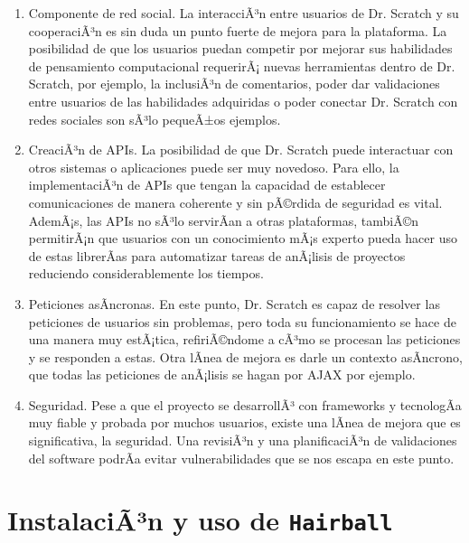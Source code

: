 \documentclass[a4paper, 12pt]{book}
\begin{document}
\begin{enumerate}
  \item Componente de red social. La interacciÃ³n entre usuarios de Dr. Scratch y su
	cooperaciÃ³n es sin duda un punto fuerte de mejora para la plataforma. La posibilidad
	de que los usuarios puedan competir por mejorar sus habilidades de pensamiento
	computacional requerirÃ¡ nuevas herramientas dentro de Dr. Scratch, por ejemplo, la
	inclusiÃ³n de comentarios, poder dar validaciones entre usuarios de las habilidades
	adquiridas o poder conectar Dr. Scratch con redes sociales son sÃ³lo pequeÃ±os ejemplos.
  \item CreaciÃ³n de APIs. La posibilidad de que Dr. Scratch puede interactuar con
	otros sistemas o aplicaciones puede ser muy novedoso. Para ello, la implementaciÃ³n
	de APIs que tengan la capacidad de establecer comunicaciones de manera coherente y
	sin pÃ©rdida de seguridad es vital. AdemÃ¡s, las APIs no sÃ³lo servirÃ­an a otras
	plataformas, tambiÃ©n permitirÃ¡n que usuarios con un conocimiento mÃ¡s experto pueda
	hacer uso de estas librerÃ­as para automatizar tareas de anÃ¡lisis de proyectos 
	reduciendo considerablemente los tiempos.
	\item Peticiones asÃ­ncronas. En este punto, Dr. Scratch es capaz de resolver las
	peticiones de usuarios sin problemas, pero toda su funcionamiento se hace de una
	manera muy estÃ¡tica, refiriÃ©ndome a cÃ³mo se procesan las peticiones y se responden
	a estas. Otra lÃ­nea de mejora es darle un contexto asÃ­ncrono, que todas las 
	peticiones de anÃ¡lisis se hagan por AJAX por ejemplo.
	\item Seguridad. Pese a que el proyecto se desarrollÃ³ con frameworks y tecnologÃ­a 
	muy fiable y probada por muchos usuarios, existe una lÃ­nea de mejora que es 
	significativa, la seguridad. Una revisiÃ³n y una planificaciÃ³n de validaciones del
	software podrÃ­a evitar vulnerabilidades que se nos escapa en este punto. 
\end{enumerate}








\cleardoublepage
\appendix
\chapter{InstalaciÃ³n y uso de \texttt{Hairball}}
\label{app:manual}





\cleardoublepage
\end{document}

